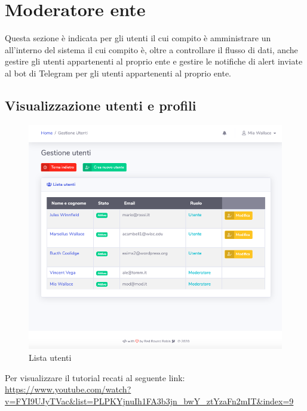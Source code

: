 \section{Moderatore ente}
Questa sezione è indicata per gli utenti il cui compito è amministrare un  all'interno del sistema il cui compito è, oltre a controllare il flusso di dati, anche gestire gli utenti appartenenti al proprio ente e gestire le notifiche di alert inviate al bot di Telegram per gli utenti appartenenti al proprio ente.

\subsection{Visualizzazione utenti e profili}
	\begin{figure}[H]
		\centering
		\includegraphics[scale=0.600]{res/images/mod/listaUtenti.png}
		\caption{Lista utenti}
	\end{figure}
Per visualizzare il tutorial recati al seguente link: 
\url{https://www.youtube.com/watch?v=FYI9UJyTVac&list=PLPKYjnuIh1FA3b3jn_bwY_ztYzaFn2mIT&index=9}

